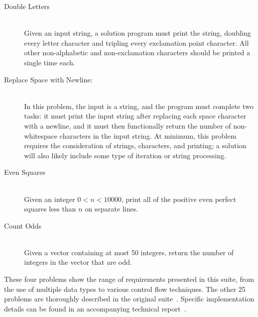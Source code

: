 \begin{description}

\item[Double Letters] \ \\
Given an input string, a solution program must print the string, doubling every letter character and tripling every exclamation point character. All other non-alphabetic and non-exclamation characters should be printed a single time each.

\item[Replace Space with Newline:]  \ \\
In this problem, the input is a string, and the program must complete two tasks: it must print the input string after replacing each space character with a newline, and it must then functionally return the number of non-whitespace characters in the input string. At minimum, this problem requires the consideration of strings, characters, and printing; a solution will also likely include some type of iteration or string processing. 

\item[Even Squares] \ \\
Given an integer $0 < n < 10000$, print all of the positive even perfect squares less than $n$ on separate lines.

\item[Count Odds] \ \\
Given a vector containing at most 50 integers, return the number of integers in the vector that are odd.

\end{description}
These four problems show the range of requirements presented in this suite, from the use of multiple data types to various control flow techniques. The other 25 problems are thoroughly described in the original suite~\cite{Helmuth2015b}. Specific implementation details can be found in an accompanying technical report~\cite{Helmuth:2015006:UM}.


